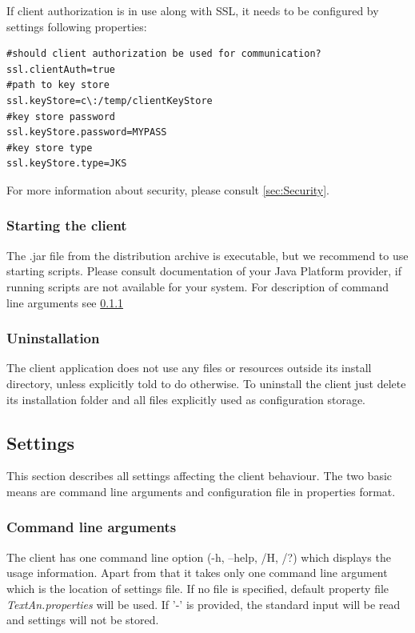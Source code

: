 \documentclass[12pt,a4paper]{report}
\begin{document}
If client authorization is in use along with SSL, it needs to be configured
by settings following properties:
\begin{lstlisting}[frame=single,language=properties]
#should client authorization be used for communication?
ssl.clientAuth=true
#path to key store
ssl.keyStore=c\:/temp/clientKeyStore
#key store password
ssl.keyStore.password=MYPASS
#key store type
ssl.keyStore.type=JKS
\end{lstlisting}

For more information about security, please consult \ref{sec:Security}.

\subsubsection{Starting the client}
\label{sssec:StartClient}

The .jar file from the distribution archive is executable,
but we recommend to use starting scripts.
Please consult documentation of your Java Platform provider,
if running scripts are not available for your system.
For description of command line arguments see \ref{ssec:CliCmdArg}

\subsubsection{Uninstallation}

The client application does not use any files or resources outside its install
directory, unless explicitly told to do otherwise.
To uninstall the client just delete its installation folder and all files
explicitly used as configuration storage.

\subsection{Settings}

This section describes all settings affecting the client behaviour.
The two basic means are command line arguments and configuration file in
properties format.

\subsubsection{Command line arguments}
\label{ssec:CliCmdArg}

The client has one command line option (-h, --help, /H, /?) which displays the
usage information. Apart from that it takes only one command line argument
which is the location of settings file. If no file is specified, default
property file \emph{TextAn.properties} will be used. If '-' is provided, the
standard input will be read and settings will not be stored.
\end{document}

